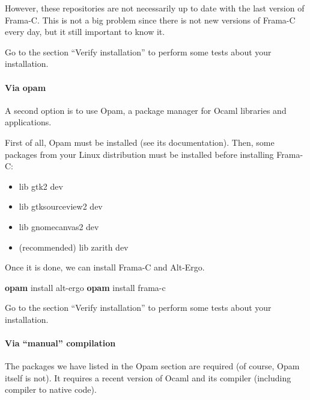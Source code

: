 \documentclass[12pt,francais,]{scrbook}
\newenvironment{Shaded}{}{}
\newcommand{\KeywordTok}[1]{\textcolor[rgb]{0.00,0.44,0.13}{\textbf{{#1}}}}
\newcommand{\NormalTok}[1]{{#1}}
\providecommand{\tightlist}{%
  \setlength{\itemsep}{0pt}\setlength{\parskip}{0pt}}
\begin{document}
However, these repositories are not necessarily up to date with the last
version of Frama-C. This is not a big problem since there is not new
versions of Frama-C every day, but it still important to know it.

Go to the section ``Verify installation'' to perform some tests about
your installation.

\paragraph{Via opam}\label{via-opam}

A second option is to use Opam, a package manager for Ocaml libraries
and applications.

First of all, Opam must be installed (see its documentation). Then, some
packages from your Linux distribution must be installed before
installing Frama-C:

\begin{itemize}
\tightlist
\item
  lib gtk2 dev
\item
  lib gtksourceview2 dev
\item
  lib gnomecanvas2 dev
\item
  (recommended) lib zarith dev
\end{itemize}

Once it is done, we can install Frama-C and Alt-Ergo.

\begin{footnotesize}\begin{Shaded}
\begin{Highlighting}[]
\KeywordTok{opam} \NormalTok{install alt-ergo}
\KeywordTok{opam} \NormalTok{install frama-c}
\end{Highlighting}
\end{Shaded}\end{footnotesize}

Go to the section ``Verify installation'' to perform some tests about
your installation.

\paragraph{\texorpdfstring{Via ``manual''
compilation}{Via manual compilation}}\label{via-manual-compilation}

The packages we have listed in the Opam section are required (of course,
Opam itself is not). It requires a recent version of Ocaml and its
compiler (including compiler to native code).
\end{document}

